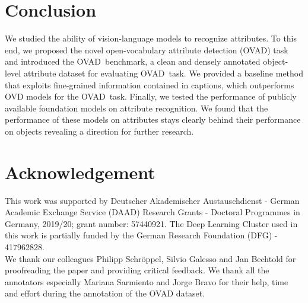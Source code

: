 \documentclass[10pt,twocolumn,letterpaper]{article}
\newcommand{\datasetname}{OVAD}
\newcommand{\taskname}{OVAD}
\begin{document}
  \label{sec:discussion}

\section{Conclusion}\label{sec:conclusion}

We studied the ability of vision-language models to recognize attributes. To this end, we proposed the novel open-vocabulary attribute detection (\taskname) task and introduced the \datasetname\ benchmark, a clean and densely annotated object-level attribute dataset for evaluating \taskname\ task. We provided a baseline method that exploits fine-grained information contained in captions, which outperforms OVD models for the \taskname\ task. Finally, we tested the performance of publicly available foundation models on attribute recognition. We found that the performance of these models on attributes stays clearly behind their performance on objects revealing a direction for further research.  
\section*{Acknowledgement}
This work was supported by Deutscher Akademischer Austauschdienst - German Academic Exchange Service (DAAD) Research Grants - Doctoral Programmes in Germany, 2019/20; grant number: 57440921. 
The Deep Learning Cluster used in this work is partially funded by the German Research Foundation (DFG) - 417962828.
\\
We thank our colleagues Philipp Schröppel, Silvio Galesso and Jan Bechtold for proofreading the paper and providing critical feedback. 
We thank all the annotators especially Mariana Sarmiento and Jorge Bravo for their help, time and effort during the annotation of the OVAD dataset. 
 
\end{document}
